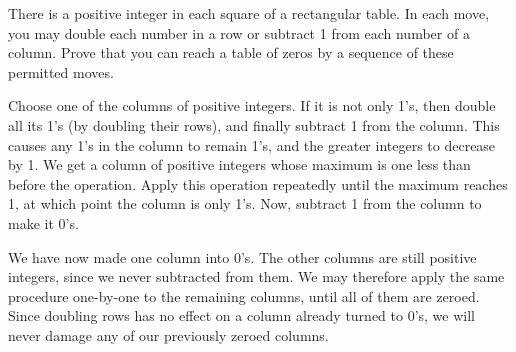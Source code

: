 

\begin{problem}
There is a positive integer in each square of a rectangular table. In each move, you
may double each number in a row or subtract 1 from each number of a column. Prove
that you can reach a table of zeros by a sequence of these permitted moves.
\end{problem}

Choose one of the columns of positive integers. If it is not only 1's, then double all its 1's (by doubling their rows), and finally subtract 1 from the column. This causes any 1's in the column to remain 1's, and the greater integers to decrease by 1. We get a column of positive integers whose maximum is one less than before the operation. Apply this operation repeatedly until the maximum reaches 1, at which point the column is only 1's. Now, subtract 1 from the column to make it 0's.

We have now made one column into 0's. The other columns are still positive integers, since we never subtracted from them. We may therefore apply the same procedure one-by-one to the remaining columns, until all of them are zeroed. Since doubling rows has no effect on a column already turned to 0's, we will never damage any of our previously zeroed columns.

